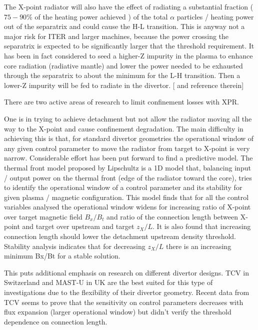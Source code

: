 The X-point radiator will also have the effect of radiating a substantial fraction ($75-90\%$ of the heating power achieved \cite{Bernert2017}) of the total $ \alpha $ particles / heating power out of the separatrix and could cause the H-L transition. This is anyway not a major risk for ITER and larger machines, because the power crossing the separatrix is expected to be significantly larger that the threshold requirement. It has been in fact considered to seed a higher-Z impurity in the plasma to enhance core radiation (radiative mantle) and lower the power needed to be exhausted through the separatrix to about the minimum for the L-H transition. Then a lower-Z impurity will be fed to radiate in the divertor. [\cite{Kallenbach2015a,Reinke2013} and reference therein]


There are two active areas of research to limit confinement losses with XPR.

One is in trying to achieve detachment but not allow the radiator moving all the way to the X-point and cause confinement degradation. The main difficulty in achieving this is that, for standard divertor geometries the operational window of any given control parameter to move the radiator from target to X-point is very narrow. Considerable effort has been put forward to find a predictive model. The thermal front model proposed by Lipschultz \cite{Lipschultz2016} is a 1D model that, balancing input / output power on the thermal front (edge of the radiator toward the core), tries to identify the operational window of a control parameter and its stability for given plasma / magnetic configuration. This model finds that for all the control variables analysed the operational window widens for increasing ratio of X-point over target magnetic field $B_x/B_t$ and ratio of the connection length between X-point and target over upstream and target $z_X/L$. It is also found that increasing connection length should lower the detachment upstream density threshold. Stability analysis indicates that for decreasing $z_X/L$ there is an increasing minimum Bx/Bt for a stable solution.\cite{Lipschultz2016}

This puts additional emphasis on research on different divertor designs. TCV in Switzerland and MAST-U in UK are the best suited for this type of investigations due to the flexibility of their divertor geometry. Recent data from TCV seems to prove that the sensitivity on control parameters decreases with flux expansion (larger operational window) but didn’t verify the threshold dependence on connection length. \cite{Theiler2017}

